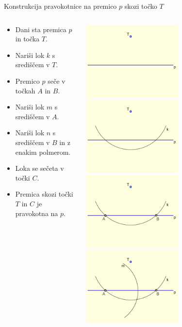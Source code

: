 \begin{frame}{Konstrukcija pravokotnice na premico $p$ skozi točko $T$}
	\begin{columns}
		\begin{column}{0.55\textwidth}
		  \begin{itemize}
			 \item<1-> Dani sta premica $p$ in točka $T$.
			 \item<2-> Nariši lok $k$ s središčem v $T$.
			 \item<3-> Premico $p$ seče v točkah $A$ in $B$.
			 \item<4-> Nariši lok $m$ s središčem v $A$.
			 \item<5-> Nariši lok $n$ s središčem v $B$ in z enakim polmerom.
			 \item<6-> Loka se sečeta v točki $C$.
			 \item<7-> Premica skozi točki $T$ in $C$ je pravokotna na $p$.
		  \end{itemize}
		\end{column}
		\begin{column}{0.45\textwidth}
			\centering
				\includegraphics[width=50mm]{slike/fig-1.png}%
				\includegraphics[width=50mm]{slike/fig-2.png}%
				\includegraphics[width=50mm]{slike/fig-3.png}%
				\includegraphics[width=50mm]{slike/fig-4.png}%

\end{column}
\end{columns}
\end{frame}
